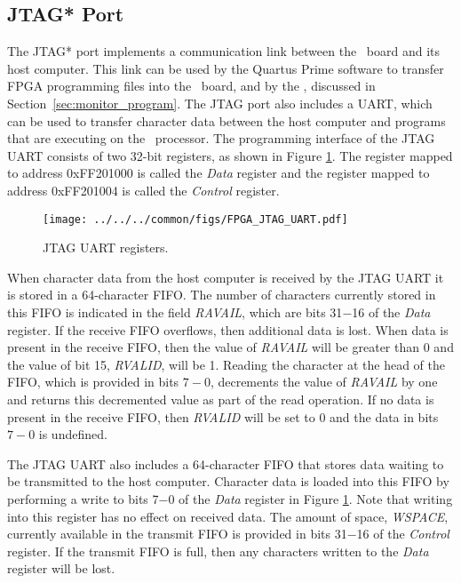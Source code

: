 \subsection{JTAG* Port}
\label{sec:jtag_port}

The JTAG* port implements a communication link between the \DEBoard~board and its host computer.  
This link can be used by the Quartus\textsuperscript{\textregistered} Prime software to transfer FPGA programming files 
into the \DEBoard~board, and by the \productNameMed{}, discussed in 
Section~\ref{sec:monitor_program}.  The JTAG port also
includes a UART, which can be used to transfer character data between the host computer and
programs that are executing on the \processor~processor.
The programming interface 
of the JTAG UART consists of two 32-bit registers, as shown in Figure \ref{fig:jtag_port}. 
The register mapped to address {\sf 0xFF201000} is called the {\it Data}
register and the register mapped to address {\sf 0xFF201004} is called the {\it Control}
register.

\begin{figure}[h!]
   \begin{center}
       \texttt{[image: ../../../common/figs/FPGA\_JTAG\_UART.pdf]}
   \end{center}
   \caption{JTAG UART registers.}
	\label{fig:jtag_port}
\end{figure}

When character data from the host computer is received by the JTAG UART 
it is stored in a 64-character FIFO.  The number of characters currently stored in this FIFO is
indicated in the field {\it RAVAIL}, which are
bits 31$-$16 of the {\it Data} register.  If the receive FIFO overflows, then
additional
data is lost. When data is present in the receive FIFO, then the value of {\it RAVAIL} will be 
greater than 0 and the value of bit 15, {\it RVALID}, will be 1. Reading the character at
the head of the FIFO, which is provided in bits $7-0$, decrements the value of {\it RAVAIL} 
by one and returns this decremented value as part of the read
operation. If no data is present in the receive FIFO, then {\it RVALID} will 
be set to 0 and the data in bits $7-0$ is undefined.

The JTAG UART also includes a 64-character FIFO that stores data 
waiting to be transmitted to the host computer. 
Character data is loaded into this FIFO by performing a write to bits 7$-$0
of the {\it Data} register in Figure \ref{fig:jtag_port}.  
Note that writing into this register has no effect 
on received data.  The amount of space, {\it WSPACE}, currently available in the transmit FIFO is 
provided in bits 31$-$16 of the {\it Control} register.  If
the transmit FIFO is full, then any characters written to the {\it Data} register will be lost.

